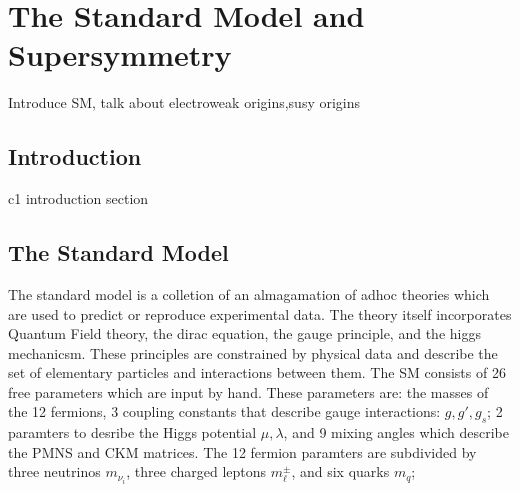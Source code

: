 



\setcounter{secnumdepth}{3}
\setcounter{tocdepth}{3}
\setlength{\parskip}{\smallskipamount}
\setlength{\parindent}{0pt}


\makeatletter


\providecommand{\tabularnewline}{\\}


\makeatother

%

\chapter{The Standard Model and Supersymmetry}

\begin{chapterabstract}
Introduce SM, talk about electroweak origins,susy origins
\end{chapterabstract}

\section{Introduction}

c1 introduction section

\section{The Standard Model}

The standard model is a colletion of an almagamation of adhoc theories which are used to predict or reproduce experimental data. The theory itself incorporates Quantum Field theory, the dirac equation, the gauge principle, and the higgs mechanicsm. These principles are constrained by physical data and describe the set of elementary particles and interactions between them. The SM  consists of 26 free parameters which are input by hand. These parameters are: the masses of the 12 fermions, 3 coupling constants that describe gauge interactions: $g, g', g_s$; 2 paramters to desribe the Higgs potential $\mu, \lambda$, and 9 mixing angles which describe the  PMNS and CKM matrices. The 12 fermion paramters are subdivided by three neutrinos $m_\nu_i$, three charged leptons $m_\ell^\pm$, and six quarks $m_q$; 

